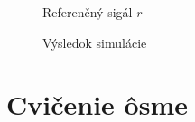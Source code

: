 ﻿\documentclass[a4paper, 10pt, ]{article}
\begin{document}
\begin{figure}[t]
	\centering


	\caption{Referenčný sigál $r$}
	\label{Referenčný sigál $r$ 6cv}

\end{figure}



\begin{figure}[t]
	\centering


	\caption{Výsledok simulácie}
	\label{Výsledok simulácie 6cv}

\end{figure}










\section{Cvičenie ôsme}
\label{cvicosme}
\end{document}
